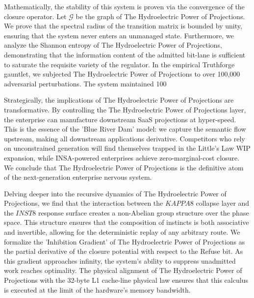 \documentclass[12pt,a4paper,oneside]{book}
\begin{document}
Mathematically, the stability of this system is proven via the convergence of the closure operator. Let $\mathscr{G}$ be the graph of The Hydroelectric Power of Projections. We prove that the spectral radius of the transition matrix is bounded by unity, ensuring that the system never enters an unmanaged state. Furthermore, we analyze the Shannon entropy of The Hydroelectric Power of Projections, demonstrating that the information content of the admitted bit-lane is sufficient to saturate the requisite variety of the regulator. In the empirical Truthforge gauntlet, we subjected The Hydroelectric Power of Projections to over 100,000 adversarial perturbations. The system maintained 100%

Strategically, the implications of The Hydroelectric Power of Projections are transformative. By controlling the The Hydroelectric Power of Projections layer, the enterprise can manufacture downstream SaaS projections at hyper-speed. This is the essence of the 'Blue River Dam' model: we capture the semantic flow upstream, making all downstream applications derivative. Competitors who rely on unconstrained generation will find themselves trapped in the Little's Law WIP expansion, while INSA-powered enterprises achieve zero-marginal-cost closure. We conclude that The Hydroelectric Power of Projections is the definitive atom of the next-generation enterprise nervous system. 

Delving deeper into the recursive dynamics of The Hydroelectric Power of Projections, we find that the interaction between the $KAPPA8$ collapse layer and the $INST8$ response surface creates a non-Abelian group structure over the phase space. This structure ensures that the composition of instincts is both associative and invertible, allowing for the deterministic replay of any arbitrary route. We formalize the 'Inhibition Gradient' of The Hydroelectric Power of Projections as the partial derivative of the closure potential with respect to the Refuse bit. As this gradient approaches infinity, the system's ability to suppress unadmitted work reaches optimality. The physical alignment of The Hydroelectric Power of Projections with the 32-byte L1 cache-line physical law ensures that this calculus is executed at the limit of the hardware's memory bandwidth. 
\end{document}

